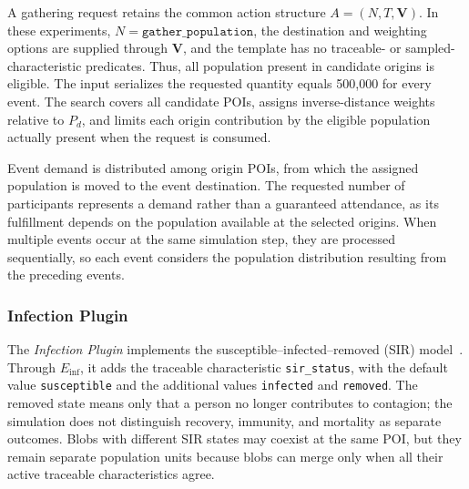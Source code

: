 A gathering request retains the common action structure $A=(N,T,\bm{V})$. In these experiments, $N=\texttt{gather\_population}$, the destination and weighting options are supplied through $\bm{V}$, and the template has no traceable- or sampled-characteristic predicates. Thus, all population present in candidate origins is eligible. The input serializes the requested quantity equals 500,000 for every event. The search covers all candidate POIs, assigns inverse-distance weights relative to $P_d$, and limits each origin contribution by the eligible population actually present when the request is consumed.

Event demand is distributed among origin POIs, from which the assigned population is moved to the event destination. The requested number of participants represents a demand rather than a guaranteed attendance, as its fulfillment depends on the population available at the selected origins. When multiple events occur at the same simulation step, they are processed sequentially, so each event considers the population distribution resulting from the preceding events.

\subsubsection{Infection Plugin}

The \textit{Infection Plugin} implements the susceptible--infected--removed (SIR) model~\cite{kermack1927contribution}. Through $E_{\mathrm{inf}}$, it adds the traceable characteristic \texttt{sir\_status}, with the default value \texttt{susceptible} and the additional values \texttt{infected} and \texttt{removed}. The removed state means only that a person no longer contributes to contagion; the simulation does not distinguish recovery, immunity, and mortality as separate outcomes. Blobs with different SIR states may coexist at the same POI, but they remain separate population units because blobs can merge only when all their active traceable characteristics agree.

